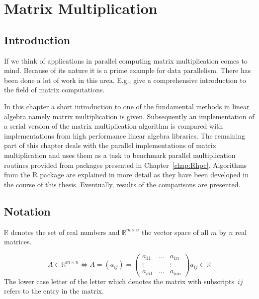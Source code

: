 

\newcommand{\NROW}{\textbf{nrow}}
\newcommand{\NCOL}{\textbf{ncol}}
\newcommand{\OMPFOR}{\textbf{!\$omp parallel for }}
\newcommand{\OMPPRIV}{\textbf{private}}
\newcommand{\OMPSHARE}{\textbf{shared}}
\newcommand{\SERIALMM}{\textbf{serial.mult}}
\newcommand{\MAX}{\textbf{max}}
\chapter{Matrix Multiplication}
\label{chap:matrix}
\section{Introduction}

If we think of applications in parallel computing matrix
multiplication comes to mind. Because of its nature it is a prime
example for data parallelism. There has been done a lot of work in
this area. E.g., \cite{golub96mc} give a comprehensive introduction to the
field of matrix computations. 


In this chapter a short introduction to one of the fundamental methods
in linear algebra namely matrix multiplication is
given. Subsequently an implementation of a serial version of the matrix
multiplication algorithm is compared with implementations from high
performance linear algebra libraries. The remaining part of this
chapter deals with the parallel implementations of matrix
multiplication and uses them as a task to benchmark parallel
multiplication routines provided from packages presented in
Chapter~\ref{chap:Rhpc}. Algorithms from the R package  are
explained in more detail as they have been developed in the course of
this thesis. Eventually, results of the comparisons are presented.

\section{Notation}

$ \mathbb{R} $ denotes the set of real numbers and $ \mathbb{R}^{m
  \times n} $ the vector space of all $m$ by $n$ real matrices.

$$ A \in \mathbb{R}^{m \times n} \Longleftrightarrow A = (a_{ij}) = 
\left( \begin{array}{ccc}
a_{11} & \ldots & a_{1n} \\
\vdots &        & \vdots \\
a_{m1} & \ldots & a_{mn}
\end{array} \right)
a_{ij} \in \mathbb{R}
 $$
The lower case letter of the letter which denotes the matrix with
subscripts~$ij$ refers to the entry in the matrix. 

